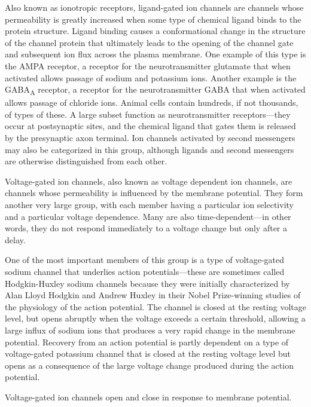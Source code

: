 Also known as ionotropic receptors, ligand-gated ion channels are channels whose permeability is greatly increased when some type of chemical ligand binds to the protein structure. Ligand binding causes a conformational change in the structure of the channel protein that ultimately leads to the opening of the channel gate and subsequent ion flux across the plasma membrane. One example of this type is the AMPA receptor, a receptor for the neurotransmitter glutamate that when activated allows passage of sodium and potassium ions. Another example is the GABA\textsubscript{A} receptor, a receptor for the neurotransmitter GABA that when activated allows passage of chloride ions. Animal cells contain hundreds, if not thousands, of types of these. A large subset function as neurotransmitter receptors---they occur at postsynaptic sites, and the chemical ligand that gates them is released by the presynaptic axon terminal. Ion channels activated by second messengers may also be categorized in this group, although ligands and second messengers are otherwise distinguished from each other.

Voltage-gated ion channels, also known as voltage dependent ion channels, are channels whose permeability is influenced by the membrane potential. They form another very large group, with each member having a particular ion selectivity and a particular voltage dependence. Many are also time-dependent---in other words, they do not respond immediately to a voltage change but only after a delay.

One of the most important members of this group is a type of voltage-gated sodium channel that underlies action potentials---these are sometimes called Hodgkin-Huxley sodium channels because they were initially characterized by Alan Lloyd Hodgkin and Andrew Huxley in their Nobel Prize-winning studies of the physiology of the action potential. The channel is closed at the resting voltage level, but opens abruptly when the voltage exceeds a certain threshold, allowing a large influx of sodium ions that produces a very rapid change in the membrane potential. Recovery from an action potential is partly dependent on a type of voltage-gated potassium channel that is closed at the resting voltage level but opens as a consequence of the large voltage change produced during the action potential.

Voltage-gated ion channels open and close in response to membrane potential.

